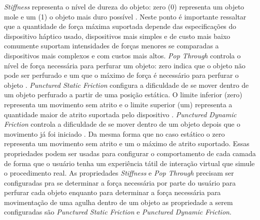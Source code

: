 \textit{Stiffness} representa o nível de dureza do objeto: zero (0) representa um objeto mole e um (1) o objeto mais duro possível \cite{3DSystemsTouch2018}. Neste ponto é importante ressaltar que a quantidade de força máxima suportada depende das especificações do dispositivo háptico usado, dispositivos mais simples e de custo mais baixo comumente suportam intensidades de forças menores se comparadas a dispositivos mais complexos e com custos mais altos. \textit{Pop Through} controla o nível de força necessária para perfurar um objeto: zero indica que o objeto não pode ser perfurado e um que o máximo de força é necessário para perfurar o objeto \cite{3DSystemsTouch2018}. \textit{Punctured Static Friction} configura a dificuldade de se mover dentro de um objeto perfurado a partir de uma posição estática. O limite inferior (zero) representa um movimento sem atrito e o limite superior (um) representa a quantidade maior de atrito suportada pelo dispositivo \cite{3DSystemsTouch2018}. \textit{Punctured Dynamic Friction} controla a dificuldade de se mover dentro de um objeto depois que o movimento já foi iniciado \cite{3DSystemsTouch2018}. Da mesma forma que no caso estático o zero representa um movimento sem atrito e um o máximo de atrito suportado. Essas propriedades podem ser usadas para configurar o comportamento de cada camada de forma que o usuário tenha um experiência tátil de interação virtual que simule o procedimento real. As propriedades \textit{Stiffness} e \textit{Pop Through} precisam ser configuradas pra se determinar a força necessária por parte do usuário para perfurar cada objeto enquanto para determinar a força necessária para movimentação de uma agulha dentro de um objeto as propriedade a serem configuradas são \textit{Punctured Static Friction} e \textit{Punctured Dynamic Friction}.

